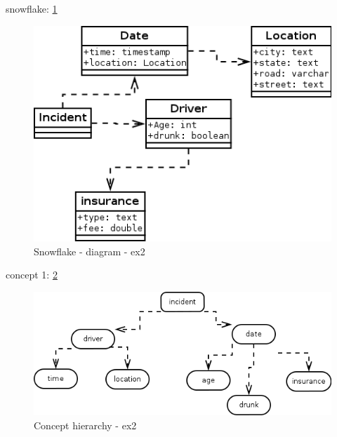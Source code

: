 \documentclass[12pt, a4paper]{article}
\begin{document}
snowflake: \ref{fig2}
\begin{figure}[htb]
    \centering
    \includegraphics[width=\textwidth]{snowflake}
    \caption{Snowflake - diagram - ex2}
    \label{fig2}
\end{figure}

concept 1: \ref{con1}
\begin{figure}[htb]
    \centering
    \includegraphics[width=\textwidth]{concept1}
    \caption{Concept hierarchy - ex2}
    \label{con1}
\end{figure}
\end{document}
